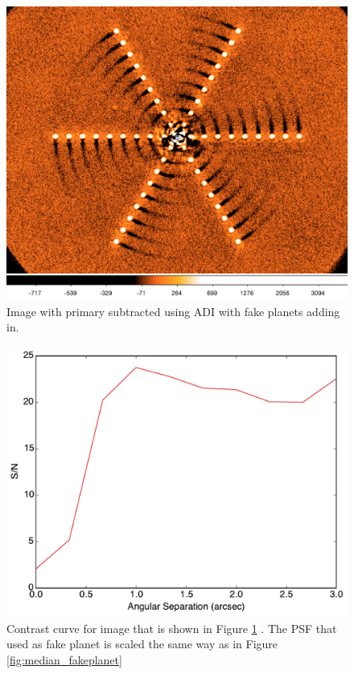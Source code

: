 \documentclass[paper=letter, fontsize=11pt]{scrartcl} %
\numberwithin{equation}{section} %
\numberwithin{figure}{section} %
\numberwithin{table}{section} %
\begin{document}
   \begin{figure}
    \centering
    \includegraphics[width=\textwidth]{adi_fake}
    \caption{Image with primary subtracted using ADI with fake planets adding
      in.}
    \label{fig:adi_fakeplanet}
  \end{figure}

  \begin{figure}
   \centering
   \includegraphics[width=\textwidth]{adi_contrastCurve_amp=2000}
   \caption{Contrast curve for image that is shown in Figure
     \ref{fig:adi_fakeplanet} . The PSF that used as fake planet is
     scaled the same way as in Figure \ref{fig:median_fakeplanet}}
   \label{adi:median_curve}
 \end{figure}
  
\end{document}
